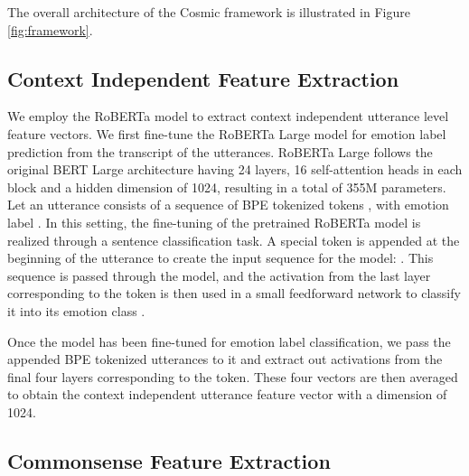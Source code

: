 \documentclass[11pt,a4paper]{article}
\begin{document}
The overall architecture of the {\sc Cosmic} framework is illustrated in Figure \ref{fig:framework}.







\subsection{Context Independent Feature Extraction}
\label{sec:text-feat-extr}

We employ the RoBERTa model \cite{liu2019roberta} to extract context independent utterance level feature vectors.
We first fine-tune the RoBERTa Large model for emotion label prediction from the transcript of the utterances. RoBERTa Large follows the original BERT Large \cite{devlin2018bert} architecture having 24 layers, 16 self-attention heads in each block and a hidden dimension of 1024, resulting in a total of 355M parameters. Let an utterance  consists of a sequence of BPE tokenized tokens , with emotion label . In this setting, the fine-tuning of the pretrained RoBERTa model is realized through a sentence classification task. A special token  is appended at the beginning of the utterance to create the input sequence for the model: . This sequence is passed through the model, and the activation from the last layer corresponding to the  token is then used in a small feedforward network to classify it into its emotion class .

Once the model has been fine-tuned for emotion label classification, we pass the  appended BPE tokenized utterances to it and extract out activations from the final four layers corresponding to the  token. These four vectors are then averaged to obtain the context independent utterance feature vector with a dimension of 1024.

\subsection{Commonsense Feature Extraction}
\label{sec:csk-feat-extr}
\end{document}
